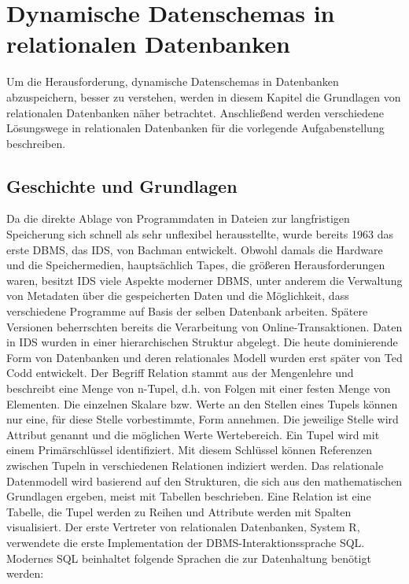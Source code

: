 \chapter{Dynamische Datenschemas in relationalen Datenbanken}

Um die Herausforderung, dynamische Datenschemas in Datenbanken abzuspeichern, besser zu verstehen, werden in diesem Kapitel die Grundlagen von relationalen Datenbanken näher betrachtet. Anschließend werden verschiedene Lösungswege in relationalen Datenbanken für die vorlegende Aufgabenstellung beschreiben.

\section{Geschichte und Grundlagen}

Da die direkte Ablage von Programmdaten in Dateien zur langfristigen Speicherung sich schnell als sehr unflexibel herausstellte, wurde bereits 1963 das erste \ac{DBMS}, das IDS, von Bachman entwickelt\cite{Haigh.2016}. Obwohl damals die Hardware und die Speichermedien, hauptsächlich Tapes, die größeren Herausforderungen waren, besitzt \ac{IDS} viele Aspekte moderner \ac{DBMS}, unter anderem die Verwaltung von Metadaten über die gespeicherten Daten und die Möglichkeit, dass verschiedene Programme auf Basis der selben Datenbank arbeiten. Spätere Versionen beherrschten bereits die Verarbeitung von Online-Transaktionen. Daten in \ac{IDS} wurden in einer hierarchischen Struktur abgelegt.
Die heute dominierende Form von Datenbanken und deren relationales Modell wurden erst später von Ted Codd entwickelt\cite{Codd.1970}. Der Begriff Relation stammt aus der Mengenlehre und beschreibt eine Menge von n-Tupel, d.h. von Folgen mit einer festen Menge von Elementen.
Die einzelnen Skalare bzw. Werte an den Stellen eines Tupels können nur eine, für diese Stelle vorbestimmte, Form annehmen. Die jeweilige Stelle wird Attribut genannt und die möglichen Werte Wertebereich. Ein Tupel wird mit einem Primärschlüssel identifiziert. Mit diesem Schlüssel können Referenzen zwischen Tupeln in verschiedenen Relationen indiziert werden.
Das relationale Datenmodell wird basierend auf den Strukturen, die sich aus den mathematischen Grundlagen ergeben, meist mit Tabellen beschrieben. Eine Relation ist eine Tabelle, die Tupel werden zu Reihen und Attribute werden mit Spalten visualisiert.
Der erste Vertreter von relationalen Datenbanken, System R, verwendete die erste Implementation der \ac{DBMS}-Interaktionssprache \ac{SQL}\cite{Chamberlin.1981}. Modernes \ac{SQL} beinhaltet folgende Sprachen die zur Datenhaltung benötigt werden\cite{Mertens.2017}:

